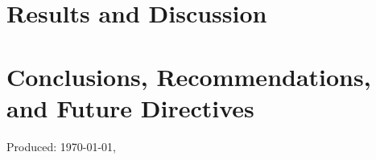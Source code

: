 \ifResultDiscuss 
	\chapter{Results and Discussion} 
	\label{ch:result_discuss} 
	\startcontents[chapters]
	\begin{SingleSpace}	
		\Mprintcontents 
	\end{SingleSpace}
	
	\stopcontents[chapters]
	\cleardoublepage
\fi

\ifConc
	\chapter{Conclusions, Recommendations, and Future Directives} 
	\label{ch:conc} 
	\startcontents[chapters]
	\begin{SingleSpace}	
		\Mprintcontents 
	\end{SingleSpace}
	
	\stopcontents[chapters]
	\cleardoublepage
\fi

\renewcommand{\UrlFont}{\normalfont}
\nocite{*} 
\begin{SingleSpace}
{\printbibliography} %
%		
%		
%		
%	

\end{SingleSpace}
\vfill
\begin{flushright}
Produced: \usdate\today, \currenttime \\
\end{flushright}
\cleardoublepage 

